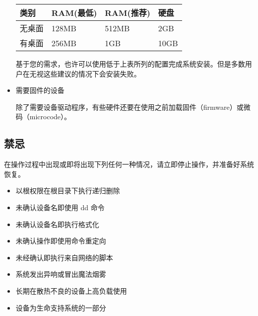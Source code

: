 \documentclass{article}
\begin{document}
\begin{multicols*}{3}
\begin{itemize}[leftmargin=*]
		{\small\begin{tabularx}{\linewidth}{|X|X|X|X|}
			\hline
			类别 & RAM\newline (最低) & RAM\newline (推荐) & 硬盘 \\
			\hline
			无桌面 & 128MB & 512MB & 2GB \\
			\hline
			有桌面 & 256MB & 1GB & 10GB \\
			\hline
		\end{tabularx}}

		基于您的需求，也许可以使用低于上表所列的配置完成系统安装。但是多数用户在无视这些建议的情况下会安装失败。

		\item 需要固件的设备

		除了需要设备驱动程序，有些硬件还要在使用之前加载固件（firmware）或微码（microcode）。

	\end{itemize}


	\begin{tcolorbox}
	\section*{禁忌}
	\end{tcolorbox}

	在操作过程中出现或即将出现下列任何一种情况，请立即停止操作，并准备好系统恢复。

	\begin{itemize}[leftmargin=*]
		\setlength{\itemsep}{0pt}
		\setlength{\parskip}{0pt}
		\setlength{\parsep}{0pt}

		\item 以根权限在根目录下执行递归删除
		\item 未确认设备名即使用 dd 命令
		\item 未确认设备名即执行格式化
		\item 未确认操作即使用命令重定向
		\item 未经确认即执行来自网络的脚本
		\item 系统发出异响或冒出魔法烟雾
		\item 长期在散热不良的设备上高负载使用
		\item 设备为生命支持系统的一部分
	\end{itemize}




\end{multicols*}
\end{document}
